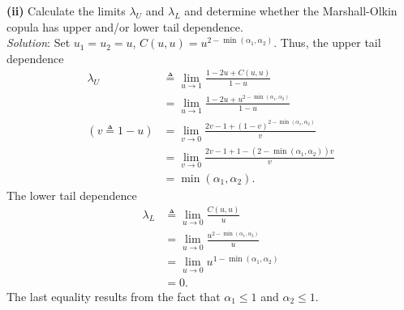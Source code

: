 \documentclass[paper=a4, fontsize=11pt]{scrartcl} %
\numberwithin{equation}{section} %
\numberwithin{figure}{section} %
\numberwithin{table}{section} %
\begin{document}
\textbf{(ii)} Calculate the limits $\lambda_U$ and $\lambda_L$ and determine whether the
Marshall-Olkin copula has upper and/or lower tail dependence.\\
\textit{Solution}: Set $u_1 = u_2 = u$,
$
C(u,u) = u^{2-\min(\alpha_1,\alpha_2)}
$. Thus, the upper tail dependence
\begin{align*}
\lambda_U &\triangleq \lim_{u\rightarrow 1}\frac{1-2u + C(u,u)}{1-u}\\
&= \lim_{u\rightarrow 1}\frac{1-2u + u^{2-\min(\alpha_1,\alpha_2)}}{1-u}\\
(v\triangleq 1-u) &= \lim_{v \rightarrow 0}\frac{2v-1 + (1-v)^{2-\min(\alpha_1,\alpha_2)}}{v}\\
&= \lim_{v \rightarrow 0}\frac{2v-1 + 1 -\left(2-\min(\alpha_1,\alpha_2)\right)v}{v}\\
&= \min(\alpha_1,\alpha_2).
\end{align*}
The lower tail dependence
\begin{align*}
\lambda_L &\triangleq \lim_{u\rightarrow 0}\frac{C(u,u)}{u}\\
&= \lim_{u\rightarrow 0}\frac{u^{2-\min(\alpha_1,\alpha_2)}}{u}\\
&= \lim_{u\rightarrow 0}u^{1-\min(\alpha_1,\alpha_2)}\\
&= 0.
\end{align*}
The last equality results from the fact that $\alpha_1\le 1$ and $\alpha_2 \le 1$.\\
\end{document}
